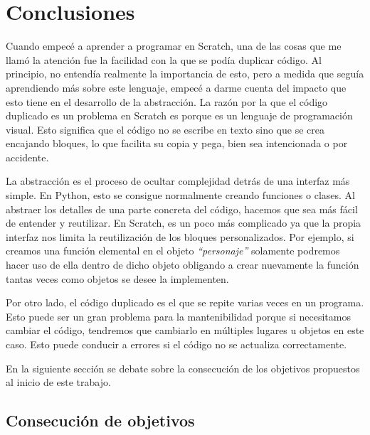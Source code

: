 \documentclass[a4paper, 12pt]{book}
\begin{document}
\cleardoublepage
\chapter{Conclusiones}
\label{chap:conclusiones}

Cuando empecé a aprender a programar en Scratch, una de las cosas que me llamó la atención fue la facilidad con la que se podía duplicar código. Al principio, no entendía realmente la importancia de esto, pero a medida que seguía aprendiendo más sobre este lenguaje, empecé a darme cuenta del impacto que esto tiene en el desarrollo de la abstracción. La razón por la que el código duplicado es un problema en Scratch es porque es un lenguaje de programación visual. Esto significa que el código no se escribe en texto sino que se crea encajando bloques, lo que facilita su copia y pega, bien sea intencionada o por accidente.

La abstracción es el proceso de ocultar complejidad detrás de una interfaz más simple. En Python, esto se consigue normalmente creando funciones o clases. Al abstraer los detalles de una parte concreta del código, hacemos que sea más fácil de entender y reutilizar. En Scratch, es un poco más complicado ya que la propia interfaz nos limita la reutilización de los bloques personalizados. Por ejemplo, si creamos una función elemental en el objeto \textit{``personaje''} solamente podremos hacer uso de ella dentro de dicho objeto obligando a crear nuevamente la función tantas veces como objetos se desee la implementen.

Por otro lado, el código duplicado es el que se repite varias veces en un programa. Esto puede ser un gran problema para la mantenibilidad porque si necesitamos cambiar el código, tendremos que cambiarlo en múltiples lugares u objetos en este caso. Esto puede conducir a errores si el código no se actualiza correctamente.

En la siguiente sección se debate sobre la consecución de los objetivos propuestos al inicio de este trabajo. 

\section{Consecución de objetivos}
\label{sec:consecucion-objetivos}


\end{document}
